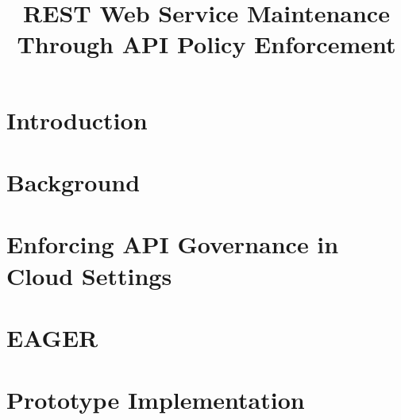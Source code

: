 \documentclass[journal]{IEEEtran}
\begin{document}
\title{REST Web Service Maintenance Through API Policy Enforcement}

\author{
}\maketitle

\begin{abstract}

\end{abstract}




\section{Introduction}
\label{sec:intro}


\section{Background}
\label{sec:bg}


\section{Enforcing API Governance in Cloud Settings}
\label{sec:enforce}


\section{EAGER}
\label{sec:eager}


\section{Prototype Implementation}
\label{sec:prototype_impl}

\end{document}
